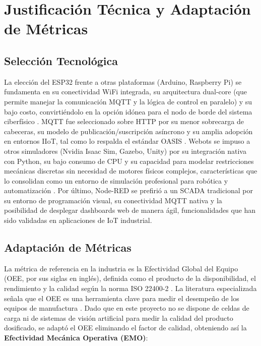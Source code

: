 \section{Justificación Técnica y Adaptación de Métricas}

\subsection{Selección Tecnológica}

La elección del ESP32 frente a otras plataformas (Arduino, Raspberry Pi) se fundamenta en su conectividad WiFi integrada, su arquitectura dual-core (que permite manejar la comunicación MQTT y la lógica de control en paralelo) y su bajo costo, convirtiéndolo en la opción idónea para el nodo de borde del sistema ciberfísico \cite{espressif2023}. MQTT fue seleccionado sobre HTTP por su menor sobrecarga de cabeceras, su modelo de publicación/suscripción asíncrono y su amplia adopción en entornos IIoT, tal como lo respalda el estándar OASIS \cite{oasis2014mqtt}. Webots se impuso a otros simuladores (Nvidia Isaac Sim, Gazebo, Unity) por su integración nativa con Python, su bajo consumo de CPU y su capacidad para modelar restricciones mecánicas discretas sin necesidad de motores físicos complejos, características que lo consolidan como un entorno de simulación profesional para robótica y automatización \cite{michel2004webots}. Por último, Node-RED se prefirió a un SCADA tradicional por su entorno de programación visual, su conectividad MQTT nativa y la posibilidad de desplegar dashboards web de manera ágil, funcionalidades que han sido validadas en aplicaciones de IoT industrial.

\subsection{Adaptación de Métricas}

La métrica de referencia en la industria es la Efectividad Global del Equipo (OEE, por sus siglas en inglés), definida como el producto de la disponibilidad, el rendimiento y la calidad según la norma ISO 22400-2 \cite{iso22400-2}. La literatura especializada señala que el OEE es una herramienta clave para medir el desempeño de los equipos de manufactura \cite{muchiri2008oee}. Dado que en este proyecto no se dispone de celdas de carga ni de sistemas de visión artificial para medir la calidad del producto dosificado, se adaptó el OEE eliminando el factor de calidad, obteniendo así la \textbf{Efectividad Mecánica Operativa (EMO)}:

